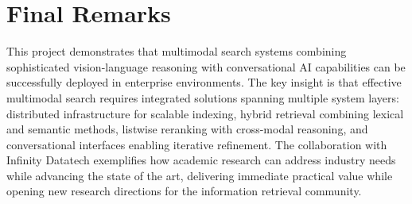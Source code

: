 \section{Final Remarks}

This project demonstrates that multimodal search systems combining sophisticated vision-language reasoning with conversational AI capabilities can be successfully deployed in enterprise environments. The key insight is that effective multimodal search requires integrated solutions spanning multiple system layers: distributed infrastructure for scalable indexing, hybrid retrieval combining lexical and semantic methods, listwise reranking with cross-modal reasoning, and conversational interfaces enabling iterative refinement. The collaboration with Infinity Datatech exemplifies how academic research can address industry needs while advancing the state of the art, delivering immediate practical value while opening new research directions for the information retrieval community.
